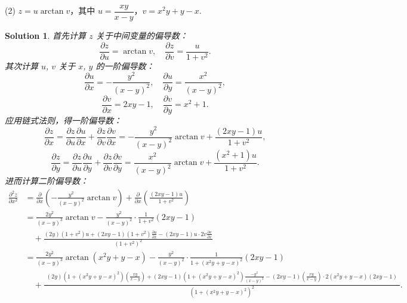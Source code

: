 \documentclass[a4paper,12pt]{article}
\newtheorem*{sol}{Solution}
\begin{document}
(2) $z = u\arctan v$，其中 $u = \dfrac{xy}{x-y}$，$v = x^2y + y - x$.
\begin{sol}
    首先计算 $z$ 关于中间变量的偏导数：
    $$
        \frac{\partial z}{\partial u} = \arctan v, \quad \frac{\partial z}{\partial v} = \frac{u}{1+v^2}.
    $$
    其次计算 $u$, $v$ 关于 $x$, $y$ 的一阶偏导数：
    $$
        \frac{\partial u}{\partial x} = -\frac{y^2}{(x-y)^2}, \quad \frac{\partial u}{\partial y} = \frac{x^2}{(x-y)^2},
    $$
    $$
        \frac{\partial v}{\partial x} = 2xy - 1, \quad \frac{\partial v}{\partial y} = x^2 + 1.
    $$
    应用链式法则，得一阶偏导数：
    $$
        \frac{\partial z}{\partial x} = \frac{\partial z}{\partial u}\frac{\partial u}{\partial x} + \frac{\partial z}{\partial v}\frac{\partial v}{\partial x} = -\frac{y^2}{(x-y)^2}\arctan v + \frac{(2xy-1)u}{1+v^2},
    $$
    $$
        \frac{\partial z}{\partial y} = \frac{\partial z}{\partial u}\frac{\partial u}{\partial y} + \frac{\partial z}{\partial v}\frac{\partial v}{\partial y} = \frac{x^2}{(x-y)^2}\arctan v + \frac{(x^2+1)u}{1+v^2}.
    $$
    进而计算二阶偏导数：
    \begin{align*}
        \frac{\partial^2 z}{\partial x^2}
         & = \frac{\partial}{\partial x}\left(-\frac{y^2}{(x-y)^2}\arctan v\right)
        + \frac{\partial}{\partial x}\left(\frac{(2xy-1)u}{1+v^2}\right)                                                                                                                                       \\
         & =  \frac{2y^2}{(x-y)^3}\arctan v
        - \frac{y^2}{(x-y)^2}\cdot\frac{1}{1+v^2}(2xy-1)                                                                                                                                                       \\
         & \quad + \frac{(2y)(1+v^2)u + (2xy-1)(1+v^2)\frac{\partial u}{\partial x} - (2xy-1)u\cdot 2v\frac{\partial v}{\partial x}}{(1+v^2)^2}                                                                \\
         & = \frac{2y^2}{(x-y)^3}\arctan (x^2y + y - x)
        - \frac{y^2}{(x-y)^2}\cdot\frac{1}{1+(x^2y + y - x)^2}(2xy-1)                                                                                                                                          \\
         & \quad + \frac{\substack{(2y)(1+(x^2y + y - x)^2)(\frac{xy}{x-y})+ (2xy-1)(1+(x^2y + y - x)^2)\frac{-y^2}{(x-y)^2}- (2xy-1)(\frac{xy}{x-y})\cdot 2(x^2y + y - x)(2xy - 1)}}{(1+(x^2y + y - x)^2)^2}.
    \end{align*}

\end{sol}
\end{document}
